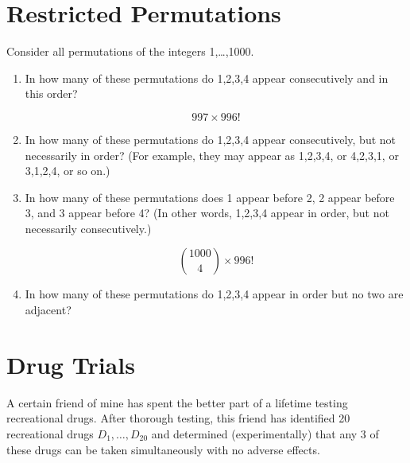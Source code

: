 \documentclass{article}
\begin{document}
\section{Restricted Permutations}

Consider all permutations of the integers 1,…,1000.

\begin{enumerate}

   \item In how many of these permutations do 1,2,3,4 appear consecutively and in this order?
   
   \[
      997 \times 996! 
   \]

   \item In how many of these permutations do 1,2,3,4 appear consecutively, but not necessarily in order? (For example, they may appear as 1,2,3,4, or 4,2,3,1, or 3,1,2,4, or so on.)

   \item In how many of these permutations does 1 appear before 2, 2 appear before 3, and 3 appear before 4? (In other words, 1,2,3,4 appear in order, but not necessarily consecutively.)
   
   \[
      \binom{1000}{4} \times 996!
   \]

   \item In how many of these permutations do 1,2,3,4 appear in order but no two are adjacent?
   
\end{enumerate}

\section{Drug Trials}

A certain friend of mine has spent the better part of a lifetime testing recreational drugs. After thorough testing, this friend has identified 20 recreational drugs $D_1,\ldots,D_{20}$ and determined (experimentally) that any 3 of these drugs can be taken simultaneously with no adverse effects.
\end{document}
